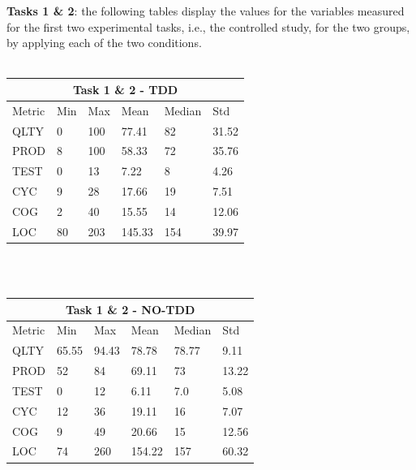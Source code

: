 \textbf{Tasks 1 \& 2}: the following tables display the values for the variables measured for the first two experimental tasks, i.e., the controlled study, for the two groups, by applying each of the two conditions.
\\ \  \\
\noindent
\begin{tabular}{ |p{2cm}||p{1.6cm}|p{1.6cm}|p{1.6cm}|p{1.6cm}|p{1.6cm}|}
    \hline
        \multicolumn{6}{|c|}{Task 1 \& 2 - TDD} \\
    \hline
        Metric & Min & Max & Mean & Median & Std\\
    \hline
        QLTY & 0 & 100 & 77.41 & 82 & 31.52 \\
        PROD & 8 & 100 & 58.33 & 72 & 35.76 \\
        TEST & 0 & 13 & 7.22 & 8 & 4.26 \\
        CYC & 9 & 28 & 17.66 & 19 & 7.51 \\
        COG & 2 & 40 & 15.55 & 14 & 12.06 \\
        LOC & 80 & 203 & 145.33 & 154 & 39.97 \\
    \hline
\end{tabular}
\\ \  \\
\noindent
\begin{tabular}{ |p{2cm}||p{1.6cm}|p{1.6cm}|p{1.6cm}|p{1.6cm}|p{1.6cm}|}
    \hline
        \multicolumn{6}{|c|}{Task 1 \& 2 - NO-TDD} \\
    \hline
        Metric & Min & Max & Mean & Median & Std\\
    \hline
        QLTY & 65.55 & 94.43 & 78.78 & 78.77 & 9.11 \\
        PROD & 52 & 84 & 69.11 & 73 & 13.22 \\
        TEST & 0 & 12 & 6.11 & 7.0 & 5.08 \\
        CYC & 12 & 36 & 19.11 & 16 & 7.07 \\
        COG & 9 & 49 & 20.66 & 15 & 12.56 \\
        LOC & 74 & 260 & 154.22 & 157 & 60.32 \\
    \hline
\end{tabular}
\\ \  \\
